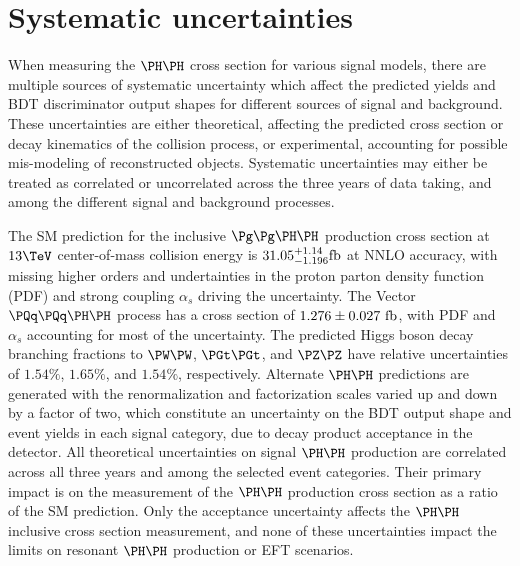 \section{Systematic uncertainties}
\label{sec:systematicUncertainties}

When measuring the $\HH$ cross section for various signal models,
there are multiple sources of systematic uncertainty which affect
the predicted yields and BDT discriminator output shapes for different
sources of signal and background.
These uncertainties are either theoretical, affecting the predicted cross
section or decay kinematics of the collision process, or experimental,
accounting for possible mis-modeling of reconstructed objects.
Systematic uncertainties may either be treated as correlated or
uncorrelated across the three years of data taking, and among the
different signal and background processes.

The SM prediction for the inclusive $\ggHH$ production cross
section at $13\TeV$ center-of-mass collision energy is
$31.05^{+1.14}_{-1.196}\text{fb}$ at NNLO accuracy, with missing higher
orders and undertainties in the proton parton density function (PDF)
and strong coupling $\alpha_{s}$ driving the uncertainty. %
The Vector $\qqHH$ process has a cross section of $1.276\pm0.027~\text{fb}$,
with PDF and $\alpha_{s}$ accounting for most of the uncertainty. %
The predicted Higgs boson decay branching fractions to $\PW\PW$,
$\PGt\PGt$, and $\PZ\PZ$ have relative uncertainties of $1.54\%$,
$1.65\%$, and $1.54\%$, respectively. %
Alternate $\HH$ predictions are generated with the renormalization
and factorization scales varied up and down by a factor of two, which
constitute an uncertainty on the BDT output shape and event yields
in each signal category, due to decay product acceptance in the detector.
All theoretical uncertainties on signal $\HH$ production are correlated
across all three years and among the selected event categories.
Their primary impact is on the measurement of the $\HH$ production
cross section as a ratio of the SM prediction.
Only the acceptance uncertainty affects the $\HH$ inclusive cross
section measurement, and none of these uncertainties impact the
limits on resonant $\HH$ production or EFT scenarios.

